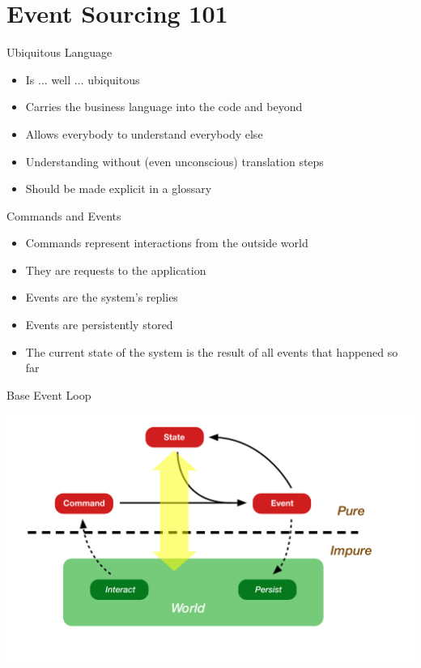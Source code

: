 \part{Event Sourcing 101}

\begin{frame}[fragile]{Ubiquitous Language}

  \begin{itemize}[<+->]
	\item Is $\ldots$ well $\ldots$ ubiquitous
	\item Carries the business language into the code and beyond
	\item Allows everybody to understand everybody else
	\item Understanding without (even unconscious) translation steps
	\item Should be made explicit in a glossary
  \end{itemize}

\end{frame}

\begin{frame}[fragile]{Commands and Events}

  \begin{itemize}[<+->]
  \item Commands represent interactions from the outside world
  \item They are requests to the application
  \item Events  are the system's replies
  \item Events are persistently stored
  \item The current state of the system is the result of all events that happened so far
  \end{itemize}
\end{frame}

\begin{frame}[fragile]{Base Event Loop}
\begin{center}
\includegraphics[width=\textwidth]{./images/event-loop.pdf}
\end{center}
\end{frame}

